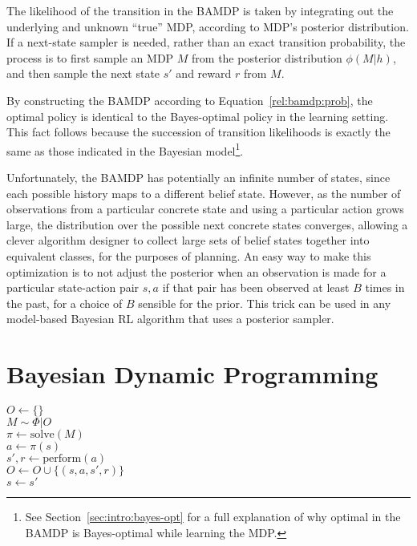The likelihood of the transition in the BAMDP is taken by integrating out the underlying and unknown ``true'' MDP, according to MDP's posterior distribution. If a next-state sampler is needed, rather than an exact transition probability, the process is to first sample an MDP $M$ from the posterior distribution $\phi(M|h)$, and then sample the next state $s'$ and reward $r$ from $M$.

By constructing the BAMDP according to Equation~\ref{rel:bamdp:prob}, the optimal policy is identical to the Bayes-optimal policy in the learning setting. This fact follows because the succession of transition likelihoods is exactly the same as those indicated in the Bayesian model\footnote{See Section~\ref{sec:intro:bayes-opt} for a full explanation of why optimal in the BAMDP is Bayes-optimal while learning the MDP.}.

Unfortunately, the BAMDP has potentially an infinite number of states, since each possible history maps to a different belief state. However, as the number of observations from a particular concrete state and using a particular action grows large, the distribution over the possible next concrete states converges, allowing a clever algorithm designer to collect large sets of belief states together into equivalent classes, for the purposes of planning. An easy way to make this optimization is to not adjust the posterior when an observation is made for a particular state-action pair $s,a$ if that pair has been observed at least $B$ times in the past, for a choice of $B$ sensible for the prior. This trick can be used in any model-based Bayesian RL algorithm that uses a posterior sampler.



\section{Bayesian Dynamic Programming}

\label{sec:rel:bdp}

\begin{algorithm}[tb]
	\caption{$\mbox{Bayesian~DP}(s, \Phi, K)$}
	\label{alg:bdp}
	$O \leftarrow \{\}$\\
	 {
		$M \sim \Phi|O$\\
		$\pi \leftarrow \mbox{solve}(M)$\\
		 {
			$a \leftarrow \pi(s)$\\
			$s', r \leftarrow \mbox{perform}(a)$\\
			$O \leftarrow O \cup \{(s, a, s', r)\} $\\
			$s \leftarrow s'$
		}
	}
\end{algorithm}

